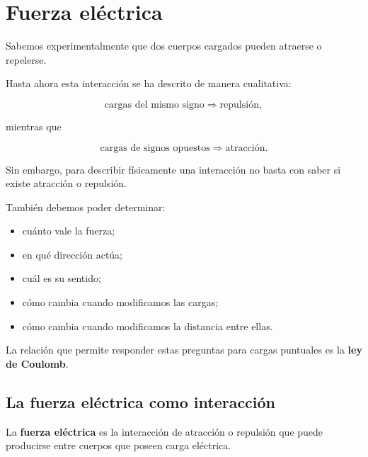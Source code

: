 


\section{Fuerza eléctrica}

Sabemos experimentalmente que dos cuerpos cargados pueden atraerse o
repelerse.

Hasta ahora esta interacción se ha descrito de manera cualitativa:

\[
\text{cargas del mismo signo}
\Longrightarrow
\text{repulsión},
\]

mientras que

\[
\text{cargas de signos opuestos}
\Longrightarrow
\text{atracción}.
\]

Sin embargo, para describir físicamente una interacción no basta con saber
si existe atracción o repulsión.

También debemos poder determinar:

\begin{itemize}
    \item cuánto vale la fuerza;
    \item en qué dirección actúa;
    \item cuál es su sentido;
    \item cómo cambia cuando modificamos las cargas;
    \item cómo cambia cuando modificamos la distancia entre ellas.
\end{itemize}

La relación que permite responder estas preguntas para cargas puntuales es
la \textbf{ley de Coulomb}.



\subsection{La fuerza eléctrica como interacción}

\begin{definicion}

La \textbf{fuerza eléctrica} es la interacción de atracción o repulsión que
puede producirse entre cuerpos que poseen carga eléctrica.

\end{definicion}

